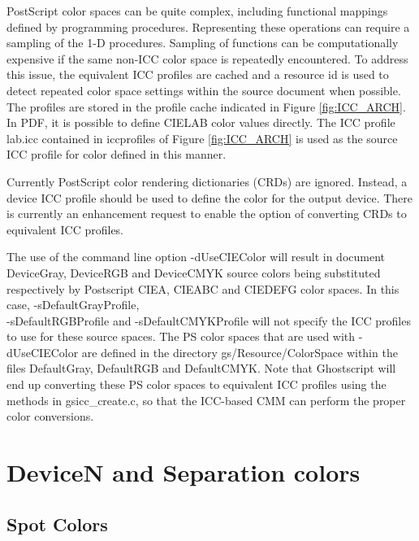 \documentclass[12pt,notitlepage]{article}
\begin{document}
PostScript color spaces can be quite complex, including functional mappings defined by programming procedures.  Representing these operations can require a sampling of the 1-D procedures.  Sampling of functions can be computationally expensive if the same non-ICC color space is repeatedly encountered.  To address this issue, the equivalent ICC profiles are cached and a resource id is used to detect repeated color space settings within the source document when possible.
The profiles are stored in the profile cache indicated in Figure \ref{fig:ICC_ARCH}.  In PDF, it is possible to define CIELAB color values directly.  The ICC profile lab.icc contained in iccprofiles of Figure \ref{fig:ICC_ARCH} is used as the source ICC profile for color defined in this manner.

Currently PostScript color rendering dictionaries (CRDs) are ignored.  Instead, a device ICC profile should be used to define the color for the output device.  There is currently an enhancement request to enable the option of converting CRDs to equivalent ICC profiles.

The use of the command line option -dUseCIEColor will result in document DeviceGray, DeviceRGB and DeviceCMYK source colors being substituted respectively by Postscript CIEA, CIEABC and CIEDEFG color spaces.  In this case, -sDefaultGrayProfile, \\
-sDefaultRGBProfile and -sDefaultCMYKProfile will not specify the ICC profiles to use for these source spaces.   The PS color spaces that are used with -dUseCIEColor are defined in the directory
gs/Resource/ColorSpace within the files DefaultGray, DefaultRGB and DefaultCMYK.   Note that Ghostscript will end up converting these PS color spaces to equivalent ICC profiles using the methods in gsicc\_create.c, so that the ICC-based CMM can perform the proper color conversions.

\section{DeviceN and Separation colors}

\subsection{Spot Colors}
\end{document}
